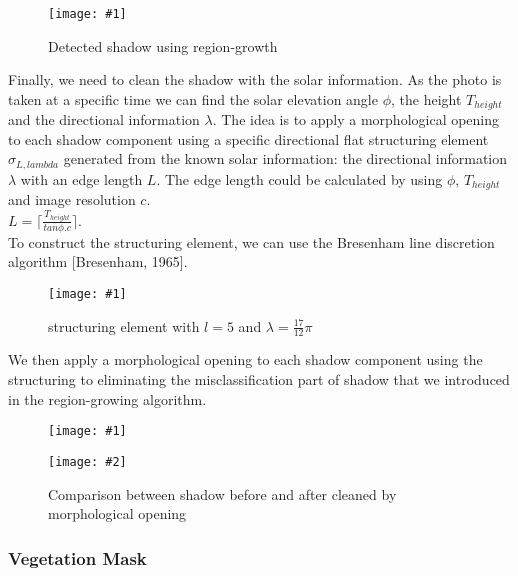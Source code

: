 \documentclass[runningheads]{llncs}
\newcommand{\insertTwoF}[5]{
  \begin{figure}[h!]
    \centering
    \begin{minipage}{#4\linewidth}
    \texttt{[image: \#1]}
    \end{minipage}
    \begin{minipage}{#4\linewidth}
    \texttt{[image: \#2]}
    \end{minipage}
      \caption{#3}
      \label{#5}
  \end{figure}  
}
\newcommand{\insertF}[4]{
  \begin{figure}[h!]
    \centering
    \begin{minipage}{#3\linewidth}
    \texttt{[image: \#1]}
    \end{minipage}  
      \caption{#2}
      \label{#4}
  \end{figure}  
}
\begin{document}
\insertF{shadow_croissance}{Detected shadow using region-growth}{0.5}{1}
Finally, we need to clean the shadow with the solar information. As the photo is taken at a specific time we can find the solar elevation angle $\phi$, the height $T_{height}$ and the directional information $\lambda$. The idea is to apply a morphological opening to each shadow component using a specific directional flat structuring element $\sigma_{L,lambda}$ generated from the known solar information: the directional information $\lambda$ with an edge length $L$. The edge length could be calculated by using $\phi$, $T_{height}$ and image resolution $c$. \\
$L=\lceil \frac{T_{height}}{tan \phi.c}\rceil$.\\
To construct the structuring element, we can use the Bresenham line discretion algorithm [Bresenham, 1965].\\
\insertF{se}{structuring element with $l=5$ and $\lambda=\frac{17}{12}\pi$}{0.3}{2}
We then apply a morphological opening to each shadow component using the structuring to eliminating the misclassification part of shadow that we introduced in the region-growing algorithm.\\
\insertTwoF{shadow_croissance}{shadow}{Comparison between shadow before and after cleaned by morphological opening}{0.4}{3}
\subsubsection{Vegetation Mask}
\end{document}
